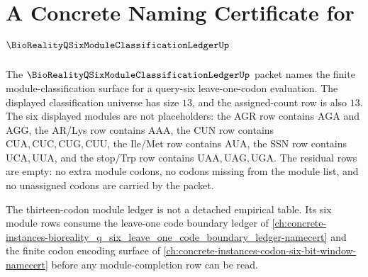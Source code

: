 \chapter{A Concrete Naming Certificate for $\BioRealityQSixModuleClassificationLedgerUp$}
\label{ch:concrete-instances-bioreality_q_six_module_classification_ledger-namecert}

The $\BioRealityQSixModuleClassificationLedgerUp$ packet names the finite module-classification surface for a query-six leave-one-codon evaluation. The displayed classification universe has size $13$, and the assigned-count row is also $13$. The six displayed modules are not placeholders: the AGR row contains $\mathrm{AGA}$ and $\mathrm{AGG}$, the AR/Lys row contains $\mathrm{AAA}$, the CUN row contains $\mathrm{CUA},\mathrm{CUC},\mathrm{CUG},\mathrm{CUU}$, the Ile/Met row contains $\mathrm{AUA}$, the SSN row contains $\mathrm{UCA},\mathrm{UUA}$, and the stop/Trp row contains $\mathrm{UAA},\mathrm{UAG},\mathrm{UGA}$. The residual rows are empty: no extra module codons, no codons missing from the module list, and no unassigned codons are carried by the packet.

The thirteen-codon module ledger is not a detached empirical table. Its six module rows consume the leave-one code boundary ledger of \autoref{ch:concrete-instances-bioreality_q_six_leave_one_code_boundary_ledger-namecert} and the finite codon encoding surface of \autoref{ch:concrete-instances-codon-six-bit-window-namecert} before any module-completion row can be read.

